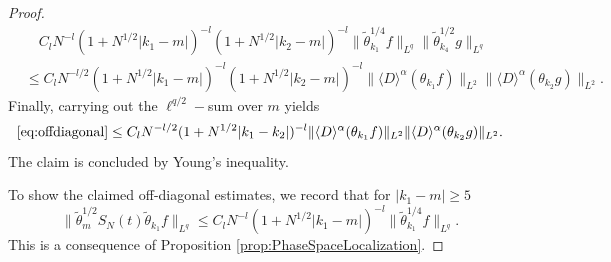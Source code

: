 \documentclass{amsart}
\numberwithin{equation}{section}
\theoremstyle{definition}
\begin{document}
\begin{proof}
\begin{equation}
\label{eq:offdiagonal}
\begin{split}
    &\quad C_l N^{-l} (1+N^{1/2} |k_1-m|)^{-l} (1+N^{1/2} |k_2-m|)^{-l} \| \tilde{\theta}_{k_1}^{1/4} f \|_{L^q} \| \tilde{\theta}^{1/2}_{k_4} g \|_{L^q} \\
    &\leq C_l N^{-l/2} (1+N^{1/2} |k_1-m|)^{-l} (1+N^{1/2} |k_2-m|)^{-l} \| \langle D \rangle^{\alpha} ( \theta_{k_1} f) \|_{L^2} \|  \langle D \rangle^{\alpha} ( \theta_{k_2} g ) \|_{L^2}.
    \end{split}
\end{equation}
Finally, carrying out the $\ell^{q/2}-$sum over $m$ yields
\begin{equation*}
   \eqref{eq:offdiagonal} \leq  C_l N^{-l/2} (1+N^{1/2} |k_1-k_2|)^{-l} \| \langle D \rangle^{\alpha} ( \theta_{k_1} f) \|_{L^2} \|  \langle D \rangle^{\alpha} ( \theta_{k_2} g ) \|_{L^2}.
\end{equation*}
The claim is concluded by Young's inequality.

To show the claimed off-diagonal estimates, we record that for $|k_1-m| \geq 5$
\begin{equation}
\label{eq:RapidOffDiagonalDecay}
    \| \tilde{\theta}_m^{1/2} S_N(t) \tilde{\theta}_{k_1} f \|_{L^q} \leq C_l N^{-l} (1+ N^{1/2} |k_1-m|)^{-l} \| \tilde{\theta}_{k_1}^{1/4} f \|_{L^q}.
\end{equation}
This is a consequence of Proposition \ref{prop:PhaseSpaceLocalization}.
\end{proof}
\end{document}
